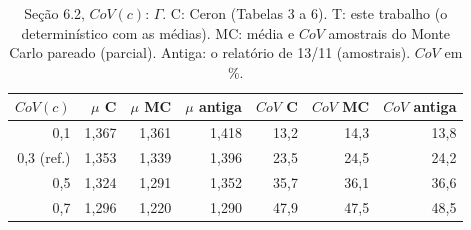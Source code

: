 \begin{table}[htbp]\centering\scriptsize\setlength{\tabcolsep}{3pt}
\caption{Seção 6.2, $CoV(c)$: $\Gamma$. C: Ceron (Tabelas 3 a 6). T: este trabalho (o determinístico com as médias). MC: média e $CoV$ amostrais do Monte Carlo pareado (parcial). Antiga: o relatório de 13/11 (amostrais). $CoV$ em \%.}\label{tab:g_covc}
\begin{tabular}{rrrrrrr}\toprule
$CoV(c)$ & $\mu$ C & $\mu$ MC & $\mu$ antiga & $CoV$ C & $CoV$ MC & $CoV$ antiga \\\midrule
0{,}1 & 1{,}367 & 1{,}361 & 1{,}418 & 13{,}2 & 14{,}3 & 13{,}8 \\
0{,}3 (ref.) & 1{,}353 & 1{,}339 & 1{,}396 & 23{,}5 & 24{,}5 & 24{,}2 \\
0{,}5 & 1{,}324 & 1{,}291 & 1{,}352 & 35{,}7 & 36{,}1 & 36{,}6 \\
0{,}7 & 1{,}296 & 1{,}220 & 1{,}290 & 47{,}9 & 47{,}5 & 48{,}5 \\
\bottomrule\end{tabular}\end{table}
